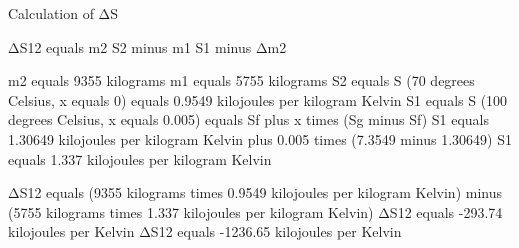 Calculation of ΔS  

ΔS12 equals m2 S2 minus m1 S1 minus Δm2  

m2 equals 9355 kilograms  
m1 equals 5755 kilograms  
S2 equals S (70 degrees Celsius, x equals 0) equals 0.9549 kilojoules per kilogram Kelvin  
S1 equals S (100 degrees Celsius, x equals 0.005) equals Sf plus x times (Sg minus Sf)  
S1 equals 1.30649 kilojoules per kilogram Kelvin plus 0.005 times (7.3549 minus 1.30649)  
S1 equals 1.337 kilojoules per kilogram Kelvin  

ΔS12 equals (9355 kilograms times 0.9549 kilojoules per kilogram Kelvin) minus (5755 kilograms times 1.337 kilojoules per kilogram Kelvin)  
ΔS12 equals -293.74 kilojoules per Kelvin  
ΔS12 equals -1236.65 kilojoules per Kelvin